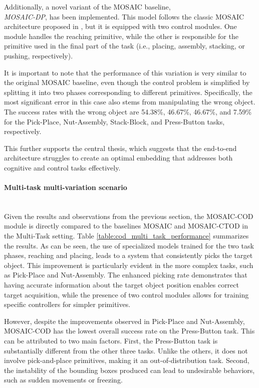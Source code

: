 Additionally, a novel variant of the MOSAIC baseline, \\ \textit{MOSAIC-DP}, has been implemented. This model follows the classic MOSAIC architecture proposed in \cite{mandi2022towards_more_generalizable_one_shot}, but it is equipped with two control modules. One module handles the reaching primitive, while the other is responsible for the primitive used in the final part of the task (i.e., placing, assembly, stacking, or pushing, respectively).

It is important to note that the performance of this variation is very similar to the original MOSAIC baseline, even though the control problem is simplified by splitting it into two phases corresponding to different primitives. Specifically, the most significant error in this case also stems from manipulating the wrong object. The success rates with the wrong object are 54.38\%, 46.67\%, 46.67\%, and 7.59\% for the Pick-Place, Nut-Assembly, Stack-Block, and Press-Button tasks, respectively. 

This further supports the central thesis, which suggests that the end-to-end architecture struggles to create an optimal embedding that addresses both cognitive and control tasks effectively.

\paragraph*{Multi-task multi-variation scenario}\mbox{}\\

Given the results and observations from the previous section, the MOSAIC-COD module is directly compared to the baselines MOSAIC and MOSAIC-CTOD in the Multi-Task setting. Table \ref{table:cod_multi_task_performance} summarizes the results. As can be seen, the use of specialized models trained for the two task phases, reaching and placing, leads to a system that consistently picks the target object. This improvement is particularly evident in the more complex tasks, such as Pick-Place and Nut-Assembly. The enhanced picking rate demonstrates that having accurate information about the target object position enables correct target acquisition, while the presence of two control modules allows for training specific controllers for simpler primitives.

However, despite the improvements observed in Pick-Place and Nut-Assembly, MOSAIC-COD has the lowest overall success rate on the Press-Button task. This can be attributed to two main factors. First, the Press-Button task is substantially different from the other three tasks. Unlike the others, it does not involve pick-and-place primitives, making it an out-of-distribution task. Second, the instability of the bounding boxes produced can lead to undesirable behaviors, such as sudden movements or freezing.

